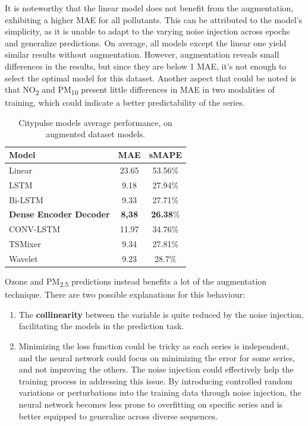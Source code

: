 It is noteworthy that the linear model does not benefit from the augmentation, exhibiting a higher MAE for all pollutants. This can be attributed to the model's simplicity, as it is unable to adapt to the varying noise injection across epochs and generalize predictions. On average, all models except the linear one yield similar results without augmentation. However, augmentation reveals small differences in the results, but since they are below 1 MAE, it's not enough to select the optimal model for this dataset.
Another aspect that could be noted is that NO\textsubscript{2} and PM\textsubscript{10} present little differences in MAE in two modalities of training, which could indicate a better predictability of the series.

\begin{table}[h]
    \centering
    \begin{tabular}{lcc}
        \toprule
        \textbf{Model} & \textbf{MAE} & \textbf{sMAPE} \\ 
        \midrule
        Linear & 23.65 & 53.56\% \\
        LSTM & 9.18 & 27.94\% \\
        Bi-LSTM & 9.33 & 27.71\% \\
        \textbf{Dense Encoder Decoder} & \textbf{8,38} & \textbf{26.38}\% \\
        CONV-LSTM & 11.97 & 34.76\% \\
        TSMixer & 9.34 & 27.81\% \\
        Wavelet & 9.23 & 28.7\% \\ 
        \bottomrule
        \end{tabular}
        \caption{Citypulse models average performance, on augmented dataset models.}
        \label{tab:Citypulse performance}
\end{table}


Ozone and PM\textsubscript{2.5} predictions instead benefits a lot of the augmentation technique. There are two possible explanations for this behaviour:
\begin{enumerate}
    \item The \textbf{collinearity} between the variable is quite reduced by the noise injection, facilitating the models in the prediction task.
    \item Minimizing the loss function could be tricky as each series is independent, and the neural network could focus on minimizing the error for some series, and not improving the others. The noise injection could effectively help the training process in addressing this issue. By introducing controlled random variations or perturbations into the training data through noise injection, the neural network becomes less prone to overfitting on specific series and is better equipped to generalize across diverse sequences.
\end{enumerate}

